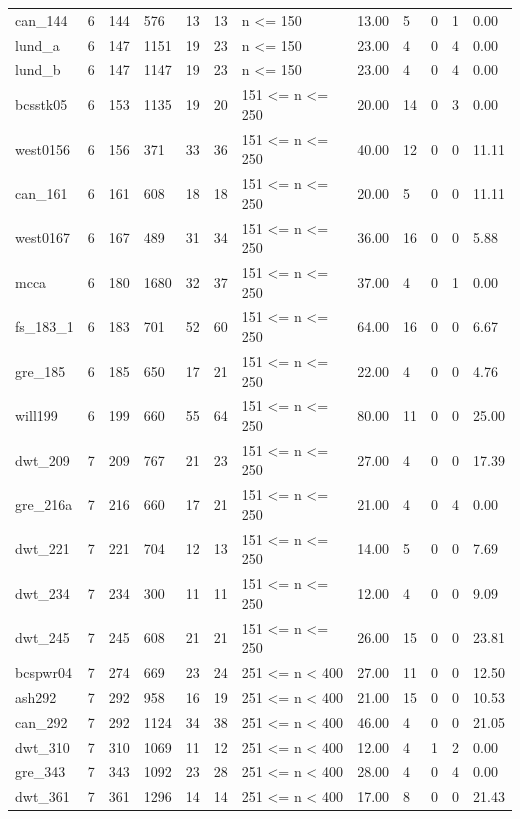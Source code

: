 \begin{tabular}{llllllllllll}
can\_144 & 6 & 144 & 576 & 13 & 13 & n <= 150 & 13.00 & 5 & 0 & 1 & 0.00 \\
lund\_a & 6 & 147 & 1151 & 19 & 23 & n <= 150 & 23.00 & 4 & 0 & 4 & 0.00 \\
lund\_b & 6 & 147 & 1147 & 19 & 23 & n <= 150 & 23.00 & 4 & 0 & 4 & 0.00 \\
bcsstk05 & 6 & 153 & 1135 & 19 & 20 & 151 <= n <= 250 & 20.00 & 14 & 0 & 3 & 0.00 \\
west0156 & 6 & 156 & 371 & 33 & 36 & 151 <= n <= 250 & 40.00 & 12 & 0 & 0 & 11.11 \\
can\_161 & 6 & 161 & 608 & 18 & 18 & 151 <= n <= 250 & 20.00 & 5 & 0 & 0 & 11.11 \\
west0167 & 6 & 167 & 489 & 31 & 34 & 151 <= n <= 250 & 36.00 & 16 & 0 & 0 & 5.88 \\
mcca & 6 & 180 & 1680 & 32 & 37 & 151 <= n <= 250 & 37.00 & 4 & 0 & 1 & 0.00 \\
fs\_183\_1 & 6 & 183 & 701 & 52 & 60 & 151 <= n <= 250 & 64.00 & 16 & 0 & 0 & 6.67 \\
gre\_185 & 6 & 185 & 650 & 17 & 21 & 151 <= n <= 250 & 22.00 & 4 & 0 & 0 & 4.76 \\
will199 & 6 & 199 & 660 & 55 & 64 & 151 <= n <= 250 & 80.00 & 11 & 0 & 0 & 25.00 \\
dwt\_209 & 7 & 209 & 767 & 21 & 23 & 151 <= n <= 250 & 27.00 & 4 & 0 & 0 & 17.39 \\
gre\_216a & 7 & 216 & 660 & 17 & 21 & 151 <= n <= 250 & 21.00 & 4 & 0 & 4 & 0.00 \\
dwt\_221 & 7 & 221 & 704 & 12 & 13 & 151 <= n <= 250 & 14.00 & 5 & 0 & 0 & 7.69 \\
dwt\_234 & 7 & 234 & 300 & 11 & 11 & 151 <= n <= 250 & 12.00 & 4 & 0 & 0 & 9.09 \\
dwt\_245 & 7 & 245 & 608 & 21 & 21 & 151 <= n <= 250 & 26.00 & 15 & 0 & 0 & 23.81 \\
bcspwr04 & 7 & 274 & 669 & 23 & 24 & 251 <= n < 400 & 27.00 & 11 & 0 & 0 & 12.50 \\
ash292 & 7 & 292 & 958 & 16 & 19 & 251 <= n < 400 & 21.00 & 15 & 0 & 0 & 10.53 \\
can\_292 & 7 & 292 & 1124 & 34 & 38 & 251 <= n < 400 & 46.00 & 4 & 0 & 0 & 21.05 \\
dwt\_310 & 7 & 310 & 1069 & 11 & 12 & 251 <= n < 400 & 12.00 & 4 & 1 & 2 & 0.00 \\
gre\_343 & 7 & 343 & 1092 & 23 & 28 & 251 <= n < 400 & 28.00 & 4 & 0 & 4 & 0.00 \\
dwt\_361 & 7 & 361 & 1296 & 14 & 14 & 251 <= n < 400 & 17.00 & 8 & 0 & 0 & 21.43 \\
\hline
\end{tabular}
